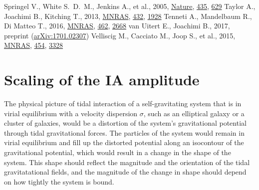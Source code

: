 \documentclass[a4paper,fleqn,usenatbib]{mnras}
\begin{document}
\begin{thebibliography}{99}
Springel V., White S.~D.~M., Jenkins A., et al., 2005, \href{http://www.nature.com/nature/journal/v435/n7042/full/nature03597.html}{Nature}, \href{http://adsabs.harvard.edu/abs/2005Natur.435..629S}{435}, \href{http://adsabs.harvard.edu/abs/2005Natur.435..629S}{629}
Taylor A., Joachimi B., Kitching T., 2013, \href{https://academic.oup.com/mnras/article-lookup/doi/10.1093/mnras/stt270}{MNRAS}, \href{http://adsabs.harvard.edu/abs/2013MNRAS.432.1928}{432}, \href{http://adsabs.harvard.edu/abs/2013MNRAS.432.1928}{1928}
Tenneti A., Mandelbaum R., Di Matteo T., 2016, \href{https://academic.oup.com/mnras/article-lookup/doi/10.1093/mnras/stw1823}{MNRAS}, \href{http://adsabs.harvard.edu/abs/2013MNRAS.432.1928}{462}, \href{http://adsabs.harvard.edu/abs/2016MNRAS.462.2668T}{2668}
van Uitert E., Joachimi B., 2017, preprint (\href{https://arxiv.org/abs/1701.02307}{arXiv:1701.02307}) 
Velliscig M., Cacciato M., Joop S., et al., 2015, \href{https://academic.oup.com/mnras/article-lookup/doi/10.1093/mnras/stv2198}{MNRAS}, \href{http://adsabs.harvard.edu/abs/2015MNRAS.454.3328V}{454}, \href{http://adsabs.harvard.edu/abs/2015MNRAS.454.3328V}{3328}

\end{thebibliography}



\appendix
\section{Scaling of the IA amplitude}\label{sect_theory}
The physical picture of tidal interaction of a self-gravitating system that is in virial equilibrium with a velocity dispersion $\sigma$, such as an elliptical galaxy or a cluster of galaxies, would be a distortion of the system's gravitational potential through tidal gravitational forces. The particles of the system would remain in virial equilibrium and fill up the distorted potential along an isocontour of the gravitational potential, which would result in a change in the shape of the system. This shape should reflect the magnitude and the orientation of the tidal gravitatational fields, and the magnitude of the change in shape should depend on how tightly the system is bound.
\end{document}
